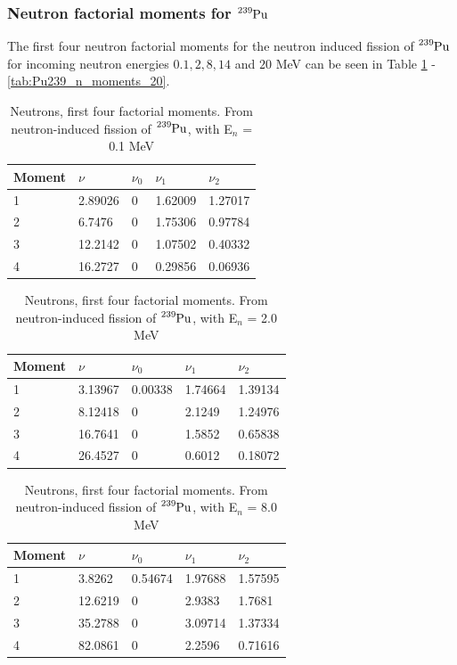 \documentclass[]{article}
\begin{document}
\subsubsection{Neutron factorial moments for $\ce{^{239}Pu}$}

The first four neutron factorial moments for the neutron induced fission of $\ce{^{239}Pu}$ for incoming neutron energies $0.1, 2, 8, 14$ and $20$ MeV can be seen in Table \ref{tab:Pu239_n_moments_0_1} - \ref{tab:Pu239_n_moments_20}.

\begin{table} [H]
	\centering
	\caption{Neutrons, first four factorial moments. From neutron-induced fission of $\ce{^{239}Pu}$, with E$_n$ = 0.1 MeV }
	\begin{tabularx}{\textwidth}{XXXXX} \hline
		\label{tab:Pu239_n_moments_0_1}
		Moment & $\nu$ & $\nu_0$ & $\nu_1$ & $\nu_2$ \\ \hline
		1 & 2.89026 & 0 &1.62009 & 1.27017\\
		2 & 6.7476 & 0 & 1.75306 & 0.97784\\
		3 & 12.2142 & 0 & 1.07502 & 0.40332\\
		4 & 16.2727 & 0 & 0.29856 & 0.06936\\ 
	\end{tabularx}
\end{table}

\begin{table} [H]
	\centering
	\caption{Neutrons, first four factorial moments. From neutron-induced fission of $\ce{^{239}Pu}$, with E$_n$ = 2.0 MeV }
	\begin{tabularx}{\textwidth}{XXXXX} \hline
		\label{tab:Pu239_n_moments_2}
		Moment & $\nu$ & $\nu_0$ & $\nu_1$ & $\nu_2$ \\ \hline
		1 & 3.13967 & 0.00338 & 1.74664 & 1.39134\\
		2 & 8.12418 & 0 & 2.1249 & 1.24976\\
		3 & 16.7641 & 0 & 1.5852 & 0.65838\\
		4 & 26.4527 & 0 & 0.6012 & 0.18072\\ 
	\end{tabularx}
\end{table}

\begin{table} [H]
	\centering
	\caption{Neutrons, first four factorial moments. From neutron-induced fission of $\ce{^{239}Pu}$, with E$_n$ = 8.0 MeV }
	\begin{tabularx}{\textwidth}{XXXXX} \hline
		\label{tab:Pu239_n_moments_8}
		Moment & $\nu$ & $\nu_0$ & $\nu_1$ & $\nu_2$ \\ \hline
		1 & 3.8262 & 0.54674 & 1.97688 & 1.57595\\
		2 & 12.6219 & 0 & 2.9383 & 1.7681\\
		3 & 35.2788 & 0 & 3.09714 & 1.37334\\
		4 & 82.0861 & 0 & 2.2596 & 0.71616\\ 
	\end{tabularx}
\end{table}
\end{document}
